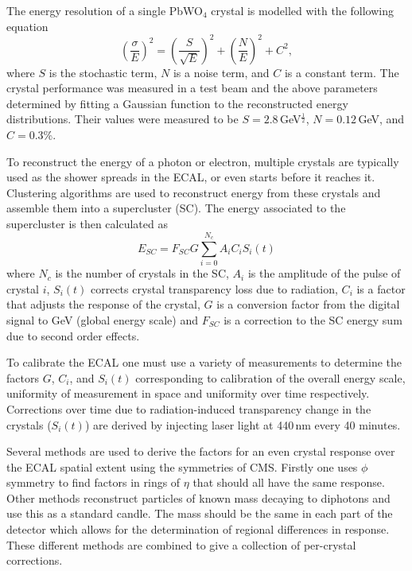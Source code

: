 The energy resolution of a single PbWO$_{4}$ crystal is modelled with the following equation \cite{CMSPhysics}
\begin{equation}
    \label{eq:apparatus:ecal_energy_reso}
        \left( \frac{\sigma}{E} \right)^{2} =  
        \left( \frac{S}{\sqrt{E}} \right)^{2} +  
        \left( \frac{N}{E} \right)^{2} +  
        C^{2},
\end{equation}
where $S$ is the stochastic term, $N$ is a noise term, and $C$ is a constant term. The crystal performance was measured in a test beam and the above parameters determined by fitting a Gaussian function to the reconstructed energy distributions. Their values were measured to be $S=2.8$\,GeV$^{\frac{1}{2}}$, $N=0.12$\,GeV, and $C=0.3$\%.

To reconstruct the energy of a photon or electron, multiple crystals are typically used as the shower spreads in the ECAL, or even starts before it reaches it. 
Clustering algorithms \cite{ecalShower} are used to reconstruct energy from these crystals and assemble them into a supercluster (SC). The energy associated to the supercluster is then calculated as
\begin{equation}
    E_{SC} = F_{SC}G\sum^{N_{c}}_{i=0}A_{i}C_{i}S_{i}(t)
\end{equation}
where $N_{c}$ is the number of crystals in the SC, $A_{i}$ is the amplitude of the pulse of crystal $i$, $S_{i}(t)$ corrects crystal transparency loss due to radiation, $C_{i}$ is a factor that adjusts the response of the crystal, $G$ is a conversion factor from the digital signal to GeV (global energy scale) and $F_{SC}$ is a correction to the SC energy sum due to second order effects.

To calibrate the ECAL \cite{cmsEcalCalibration} one must use a variety of measurements to determine the factors $G$, $C_{i}$, and $S_{i}(t)$ corresponding to calibration of the overall energy scale, uniformity of measurement in space and uniformity over time respectively. 
Corrections over time due to radiation-induced transparency change in the crystals ($S_{i}(t)$) are derived by injecting laser light at 440\,nm every 40 minutes. 

Several methods are used to derive the factors for an even crystal response over the ECAL spatial extent using the symmetries of CMS. Firstly one uses $\phi$ symmetry to find factors in rings of $\eta$ that should all have the same response. 
Other methods reconstruct particles of known mass decaying to diphotons and use this as a standard candle. The mass should be the same in each part of the detector which allows for the determination of regional differences in response. These different methods are combined to give a collection of per-crystal corrections. 

